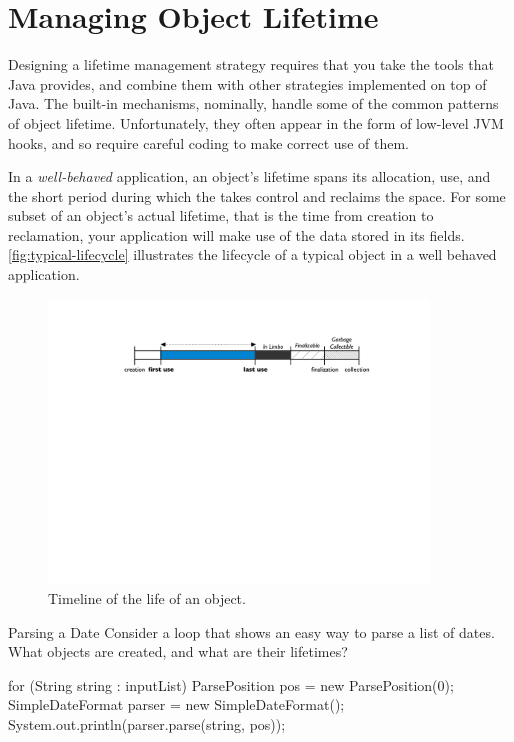 \chapter{Managing Object Lifetime}

Designing a lifetime management strategy
requires that you take the tools that Java provides, and combine them
with other strategies implemented on top of Java. The built-in mechanisms,
nominally, handle some of the common patterns of object lifetime.
Unfortunately, they often appear in the form of low-level JVM hooks, and so
require careful coding to make correct use of them.  

In a \emph{well-behaved} application, an object's lifetime spans its allocation,
use, and the short period during which the \jre takes control and reclaims the
space. For some subset of an object's actual lifetime, that is the time from
creation to reclamation, your application will make use of the data stored in its
fields. \autoref{fig:typical-lifecycle} illustrates the lifecycle of a typical
object in a well behaved application.

\begin{figure}
	\includegraphics[width=0.9\textwidth]{Figures/lifetime/object-lifecycle}
	\caption{Timeline of the life of an object.}
	\label{fig:typical-lifecycle}
\end{figure}

\begin{example}{Parsing a Date} Consider a loop that shows an easy way to parse
a list of dates. What objects are created, and what are their lifetimes?
\begin{shortlisting}
for (String string : inputList) {
	ParsePosition pos = new ParsePosition(0);
	SimpleDateFormat parser = new SimpleDateFormat();
	System.out.println(parser.parse(string, pos));
}
\end{shortlisting}
\end{example}

